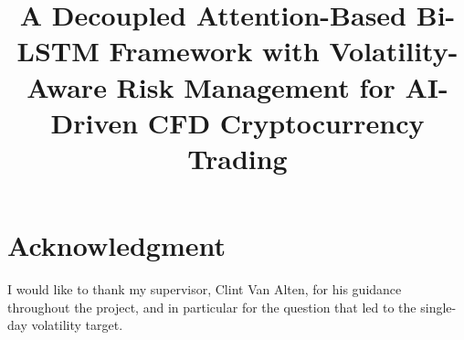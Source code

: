 \documentclass[conference]{IEEEtran}
\begin{document}
\title{A Decoupled Attention-Based Bi-LSTM Framework with Volatility-Aware Risk Management for AI-Driven CFD Cryptocurrency Trading}

\author{
}

\maketitle




\section*{Acknowledgment}
I would like to thank my supervisor, Clint Van Alten, for his guidance throughout the project, and in particular for the question that led to the single-day volatility target.




\appendices



\end{document}
